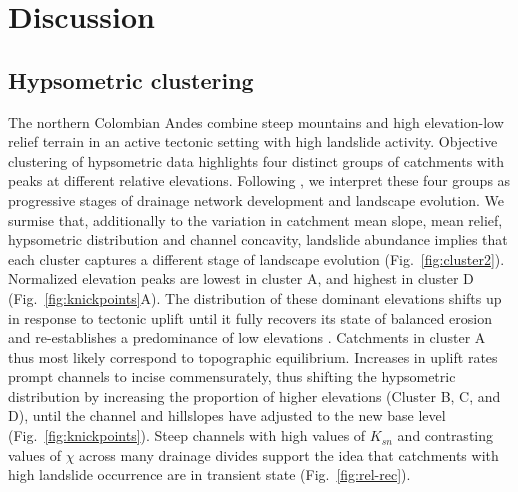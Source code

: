 \documentclass[draft]{agujournal2019}
\begin{document}

\section{Discussion}

\subsection{Hypsometric clustering}

\par The northern Colombian Andes combine steep mountains and high elevation-low relief terrain in an active tectonic setting with high landslide activity. Objective clustering of hypsometric data highlights four distinct groups of catchments with peaks at different relative elevations. Following \cite{Gallen2011}, we interpret these four groups as progressive stages of drainage network development and landscape evolution. We surmise that, additionally to the variation in catchment mean slope, mean relief, hypsometric distribution and channel concavity, landslide abundance implies that each cluster captures a different stage of landscape evolution (Fig.~\ref{fig:cluster2}). Normalized elevation peaks are lowest in cluster A, and highest in cluster D (Fig.~\ref{fig:knickpoints}A). The distribution of these dominant elevations shifts up in response to tectonic uplift until it fully recovers its state of balanced erosion and re-establishes a predominance of low elevations \cite{Gallen2011}. Catchments in cluster A thus most likely correspond to topographic equilibrium. Increases in uplift rates prompt channels to incise commensurately, thus shifting the hypsometric distribution by increasing the proportion of higher elevations (Cluster B, C, and D), until the channel and hillslopes have adjusted to the new base level (Fig.~\ref{fig:knickpoints}). Steep channels with high values of $K_{sn}$ and contrasting values of $\chi$ across many drainage divides support the idea that catchments with high landslide occurrence are in transient state (Fig.~\ref{fig:rel-rec}).
\end{document}
